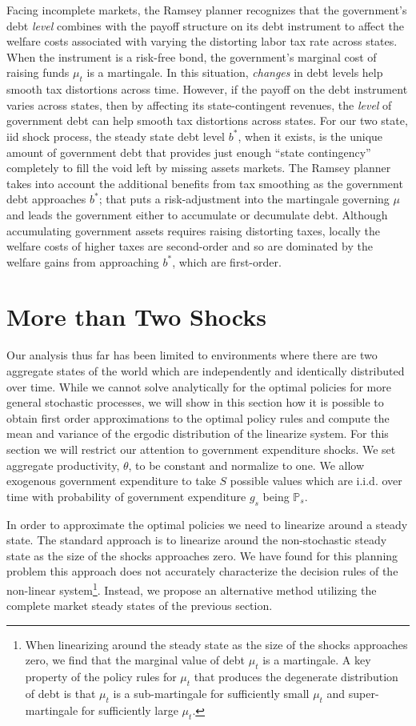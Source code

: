 \documentclass[12pt]{article}
\begin{document}
	  Facing incomplete markets, the  Ramsey planner recognizes that   the government's debt {\em level} combines with  the
 payoff structure on its debt instrument to affect  the welfare costs associated with varying the distorting labor tax rate across states.  When the
  instrument is a risk-free bond, the government's marginal cost of raising funds $\mu_t$ is  a martingale. In this situation,
    {\em changes} in debt levels  help smooth tax distortions across time.
	However, if the  payoff on the debt instrument varies across states, then  by affecting its state-contingent revenues, the {\em level} of government debt can help smooth tax distortions across states.
	For our two state, iid shock process,  the steady state debt level $b^*$, when it exists, is the unique amount of government debt
that provides just enough ``state contingency'' completely to fill the void left by  missing assets markets.  The Ramsey planner takes into account the additional benefits from tax smoothing as the government debt approaches $b^*$;  that puts a risk-adjustment into the martingale governing $\mu$ and leads the
 government either to accumulate or decumulate debt.
	 Although accumulating government assets requires  raising distorting  taxes, locally  the welfare costs of higher taxes are second-order and
so are  dominated by the welfare gains from approaching  $b^*$, which are first-order.

\section{More than Two Shocks}
Our analysis thus far has been limited to environments where there are two aggregate states of the world which are independently and identically distributed over time.  While we cannot solve analytically for the optimal policies for more general stochastic processes, we will show in this section how it is possible to obtain first order approximations to the optimal policy rules and compute the mean and variance of the ergodic distribution of the linearize system.  For this section we will restrict our attention to government expenditure shocks.   We set aggregate productivity, $\theta$, to be constant and normalize to one.  We allow exogenous government expenditure to take $S$ possible values which are i.i.d. over time with probability of government expenditure $g_s$  being $\mathbb P_s$. 

In order to approximate the optimal policies we need to linearize around a steady state.  The standard approach is to linearize around the non-stochastic steady state as the size of the shocks approaches zero.  We have found for this planning problem this approach does not accurately characterize the decision rules of the non-linear system\footnote{When linearizing around the steady state as the size of the shocks approaches zero, we find that the marginal value of debt $\mu_t$ is a martingale.  A key property of the policy rules for $\mu_t$ that produces the degenerate distribution of debt is that $\mu_t$ is a sub-martingale for sufficiently small $\mu_t$ and super-martingale for sufficiently large $\mu_t$.}.  Instead, we propose an alternative method utilizing the complete market steady states of the previous section.
\end{document}
